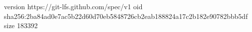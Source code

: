 version https://git-lfs.github.com/spec/v1
oid sha256:2ba84ad0e7ac5b22d60d70eb5848726cb2eab188824a17c2b182e90782bbb5df
size 183392

